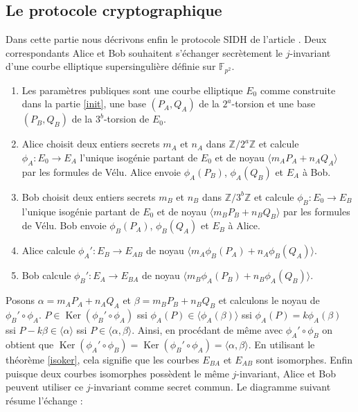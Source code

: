 \documentclass{article}
\theoremstyle{plain}%
\theoremstyle{definition}%
\newcommand{\F}{\mathbb{F}}
\newcommand{\Z}{\mathbb{Z}}
\DeclareMathOperator{\Ker}{Ker}
\begin{document}
\subsection{Le protocole cryptographique}

Dans cette partie nous décrivons enfin le protocole SIDH de l'article \cite{DeFeo}. Deux correspondants Alice et Bob souhaitent s'échanger secrètement le $j$-invariant d'une courbe elliptique supersingulière définie sur $\F_{p^2}$.



\begin{enumerate}
  \item Les paramètres publiques sont une courbe elliptique $E_0$ comme construite dans la partie \ref{init}, une base $(P_A, Q_A)$ de la $2^a$-torsion et une base $(P_B, Q_B)$ de la $3^b$-torsion de $E_0$.
\item Alice choisit deux entiers secrets $m_A$ et $n_A$ dans $\Z/2^a\Z$ et calcule $\phi_A : E_0 \to E_A$ l'unique isogénie partant de $E_0$ et de noyau $\langle m_AP_A +n_AQ_A \rangle$ par les formules de Vélu. Alice envoie $\phi_A(P_B)$, $\phi_A(Q_B)$ et $E_A$ à Bob.
  \item  
    Bob   choisit deux entiers secrets $m_B$ et $n_B$ dans $\Z/3^b\Z$ et calcule $\phi_B : E_0 \to E_B$ l'unique isogénie partant de $E_0$ et de noyau $\langle m_BP_B +n_BQ_B \rangle$ par les formules de Vélu. Bob envoie $\phi_B(P_A)$, $\phi_B(Q_A)$ et $E_B$ à Alice.
  \item Alice calcule $\phi_A' : E_B\to E_{AB}$ de noyau $\langle m_A\phi_B(P_A) + n_A\phi_B(Q_A)\rangle$.
  \item Bob calcule $\phi_B' : E_A\to E_{BA}$ de noyau $\langle m_B\phi_A(P_B) + n_B\phi_A(Q_B)\rangle$.
\end{enumerate}


Posons $\alpha = m_AP_A+n_AQ_A$ et $\beta = m_BP_B + n_BQ_B$ et calculons le noyau de $\phi_B' \circ \phi_A$.  
$P\in \Ker (\phi_B' \circ \phi_A)$ 
ssi $\phi_A(P) \in \langle \phi_A(\beta)\rangle$
ssi $\phi_A(P) = k \phi_A(\beta)$
ssi $P - k \beta \in \langle \alpha\rangle$
ssi $P\in \langle \alpha, \beta\rangle$. 
Ainsi, en procédant de même avec $\phi_A' \circ \phi_B$ on obtient que $\Ker (\phi_A' \circ \phi_B) = \Ker (\phi_B' \circ \phi_A) =  \langle \alpha, \beta\rangle$. En utilisant le théorème \ref{isoker}, cela signifie que les courbes $E_{BA}$ et $E_{AB}$ sont isomorphes. Enfin puisque deux courbes isomorphes possèdent le même $j$-invariant, Alice et Bob peuvent utiliser ce $j$-invariant comme secret commun. Le diagramme suivant résume l'échange :
\end{document}
